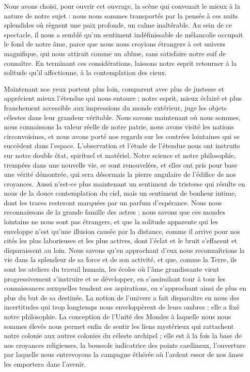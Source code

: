 \documentclass[a4paper, 11pt, oneside, landscape]{article}
\begin{document}
Nous avons choisi, pour ouvrir cet ouvrage, la scène qui convenait le mieux à la nature de notre sujet : nous nous sommes transportés par la pensée à ces nuits splendides où règnent une paix profonde, un calme inaltérable. Au sein de ce spectacle, il nous a semblé qu'un sentiment indéfinissable de mélancolie occupait le fond de notre âme, parce que nous nous croyions étrangers à cet univers magnifique, qui nous attirait comme un abîme, sans satisfaire notre soif de connaître. En terminant ces considérations, laissons notre esprit retourner à la solitude qu'il affectionne, à la contemplation des cieux.

Maintenant nos yeux portent plus loin, comparent avec plus de justesse et apprécient mieux l'étendue qui nous entoure ; notre esprit, mieux éclairé et plus franchement accessible aux impressions du monde extérieur, juge les objets célestes dans leur grandeur véritable. Nous savons maintenant où nous sommes, nous connaissons la valeur réelle de notre patrie, nous avons visité les nations circonvoisines, et nous avons porté nos regards sur les contrées lointaines qui se succèdent dans l'espace. L'observation et l'étude de l'étendue nous ont instruits sur notre double état, spirituel et matériel. Notre science et notre philosophie, trempées dans une nouvelle vie, se sont renouvelées, et elles ont pris pour base une vérité démontrée, qui sera désormais la pierre angulaire de l'édifice de nos croyances. Aussi n'est-ce plus maintenant un sentiment de tristesse qui résulte en nous de la douce contemplation du ciel, mais un sentiment de bonheur intime, dont les traces resteront marquées par un parfum d'espérance. Nous nous reconnaissons de la grande famille des astres ; nous savons que ces mondes lointains ne nous sont pas étrangers, et que la solitude apparente qui les enveloppe n'est qu'une illusion causée par la distance, comme il arrive pour nos cités les plus laborieuses et les plus actives, dont l'éclat et le bruit s'effacent et disparaissent au loin. Nous savons qu'en approchant d'eux nous reconnaîtrions la vie dans la splendeur de sa force et de son activité, et que, comme la Terre, ils sont les ateliers du travail humain, les écoles où l'âme grandissante vient progressivement s'instruire et se développer, en s'assimilant tour à tour les connaissances auxquelles tendent ses aspirations, en s'approchant ainsi de plus en plus du but de sa destinée. La notion de l'univers a fait disparaître en nous des incertitudes qui trop longtemps nous enveloppèrent de leurs ombres : elle a fixé notre philosophie. La conception de l'Unité des Mondes à laquelle nous nous sommes élevés nous permet enfin de sentir les liens mystérieux qui rattachent notre colonie aux autres colonies du céleste archipel ; elle est à la fois la base de nos croyances religieuses, la boussole indicatrice des points cardinaux, l'ouverture par laquelle nous entrevoyons la campagne éthérée où l'ardent essor de nos âmes les emportera dans l'avenir.
\end{document}
